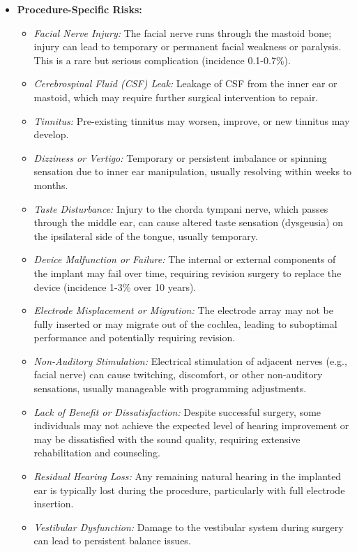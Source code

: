 \begin{itemize}
  \item \textbf{Procedure-Specific Risks:}
    \begin{itemize}
      \item \textit{Facial Nerve Injury:} The facial nerve runs through the mastoid bone; injury can lead to temporary or permanent facial weakness or paralysis. This is a rare but serious complication (incidence 0.1-0.7\%).
      \item \textit{Cerebrospinal Fluid (CSF) Leak:} Leakage of CSF from the inner ear or mastoid, which may require further surgical intervention to repair.
      \item \textit{Tinnitus:} Pre-existing tinnitus may worsen, improve, or new tinnitus may develop.
      \item \textit{Dizziness or Vertigo:} Temporary or persistent imbalance or spinning sensation due to inner ear manipulation, usually resolving within weeks to months.
      \item \textit{Taste Disturbance:} Injury to the chorda tympani nerve, which passes through the middle ear, can cause altered taste sensation (dysgeusia) on the ipsilateral side of the tongue, usually temporary.
      \item \textit{Device Malfunction or Failure:} The internal or external components of the implant may fail over time, requiring revision surgery to replace the device (incidence 1-3\% over 10 years).
      \item \textit{Electrode Misplacement or Migration:} The electrode array may not be fully inserted or may migrate out of the cochlea, leading to suboptimal performance and potentially requiring revision.
      \item \textit{Non-Auditory Stimulation:} Electrical stimulation of adjacent nerves (e.g., facial nerve) can cause twitching, discomfort, or other non-auditory sensations, usually manageable with programming adjustments.
      \item \textit{Lack of Benefit or Dissatisfaction:} Despite successful surgery, some individuals may not achieve the expected level of hearing improvement or may be dissatisfied with the sound quality, requiring extensive rehabilitation and counseling.
      \item \textit{Residual Hearing Loss:} Any remaining natural hearing in the implanted ear is typically lost during the procedure, particularly with full electrode insertion.
      \item \textit{Vestibular Dysfunction:} Damage to the vestibular system during surgery can lead to persistent balance issues.
    \end{itemize}
\end{itemize}

